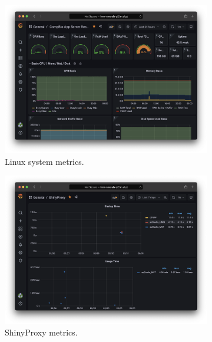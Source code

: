 \begin{figure}[!h]
	\centering
	\begin{subfigure}[h]{0.45\textwidth} 
		\includegraphics[width=\textwidth]{images/app-server/grafana-system}
		\caption{Linux system metrics.}
	\end{subfigure}
	\begin{subfigure}[h]{0.45\textwidth}
		\includegraphics[width=\textwidth]{images/app-server/grafana-shinyproxy}
		\caption{ShinyProxy metrics.}
	\end{subfigure}
	\begin{subfigure}[h]{0.45\textwidth}

\end{subfigure}
\end{figure}
